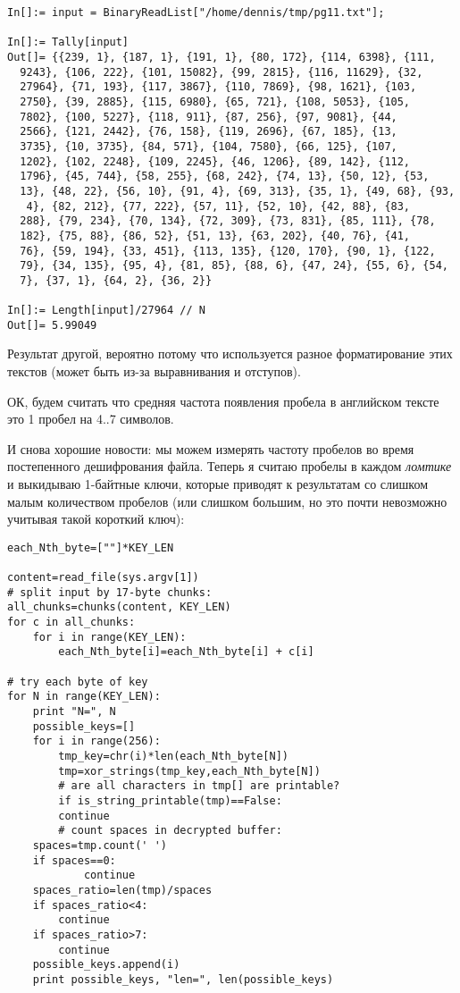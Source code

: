 \begin{lstlisting}[caption=Mathematica,style=custommath]
In[]:= input = BinaryReadList["/home/dennis/tmp/pg11.txt"];

In[]:= Tally[input]
Out[]= {{239, 1}, {187, 1}, {191, 1}, {80, 172}, {114, 6398}, {111, 
  9243}, {106, 222}, {101, 15082}, {99, 2815}, {116, 11629}, {32, 
  27964}, {71, 193}, {117, 3867}, {110, 7869}, {98, 1621}, {103, 
  2750}, {39, 2885}, {115, 6980}, {65, 721}, {108, 5053}, {105, 
  7802}, {100, 5227}, {118, 911}, {87, 256}, {97, 9081}, {44, 
  2566}, {121, 2442}, {76, 158}, {119, 2696}, {67, 185}, {13, 
  3735}, {10, 3735}, {84, 571}, {104, 7580}, {66, 125}, {107, 
  1202}, {102, 2248}, {109, 2245}, {46, 1206}, {89, 142}, {112, 
  1796}, {45, 744}, {58, 255}, {68, 242}, {74, 13}, {50, 12}, {53, 
  13}, {48, 22}, {56, 10}, {91, 4}, {69, 313}, {35, 1}, {49, 68}, {93,
   4}, {82, 212}, {77, 222}, {57, 11}, {52, 10}, {42, 88}, {83, 
  288}, {79, 234}, {70, 134}, {72, 309}, {73, 831}, {85, 111}, {78, 
  182}, {75, 88}, {86, 52}, {51, 13}, {63, 202}, {40, 76}, {41, 
  76}, {59, 194}, {33, 451}, {113, 135}, {120, 170}, {90, 1}, {122, 
  79}, {34, 135}, {95, 4}, {81, 85}, {88, 6}, {47, 24}, {55, 6}, {54, 
  7}, {37, 1}, {64, 2}, {36, 2}}

In[]:= Length[input]/27964 // N
Out[]= 5.99049
\end{lstlisting}

Результат другой, вероятно потому что используется разное форматирование этих текстов (может быть из-за выравнивания
и отступов).

ОК, будем считать что средняя частота появления пробела в английском тексте это 1 пробел на 4..7 символов.

И снова хорошие новости: мы можем измерять частоту пробелов во время постепенного дешифрования файла.
Теперь я считаю пробелы в каждом \emph{ломтике} и выкидываю 1-байтные ключи, которые приводят к результатам со слишком
малым количеством пробелов
(или слишком большим, но это почти невозможно учитывая такой короткий ключ):

\begin{lstlisting}[caption=Python script,style=custompy]
each_Nth_byte=[""]*KEY_LEN

content=read_file(sys.argv[1])
# split input by 17-byte chunks:
all_chunks=chunks(content, KEY_LEN)
for c in all_chunks:
    for i in range(KEY_LEN):
        each_Nth_byte[i]=each_Nth_byte[i] + c[i]

# try each byte of key
for N in range(KEY_LEN):
    print "N=", N
    possible_keys=[]
    for i in range(256):
        tmp_key=chr(i)*len(each_Nth_byte[N])
        tmp=xor_strings(tmp_key,each_Nth_byte[N])
        # are all characters in tmp[] are printable?
        if is_string_printable(tmp)==False:
	    continue
        # count spaces in decrypted buffer:
	spaces=tmp.count(' ')
	if spaces==0:
            continue
	spaces_ratio=len(tmp)/spaces
	if spaces_ratio<4:
	    continue
	if spaces_ratio>7:
	    continue
	possible_keys.append(i)
    print possible_keys, "len=", len(possible_keys)
\end{lstlisting}


